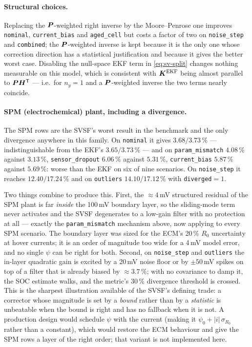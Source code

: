 \paragraph{Structural choices.}  Replacing the $\bm{P}$-weighted right inverse by the Moore--Penrose
one improves \texttt{nominal}, \texttt{current\_bias} and \texttt{aged\_cell} but costs a factor of
two on \texttt{noise\_step} and \texttt{combined}; the $\bm{P}$-weighted inverse is kept because it is
the only one whose correction direction has a statistical justification and because it gives the
better worst case.  Disabling the null-space EKF term in \eqref{eq:sv-split} changes nothing
measurable on this model, which is consistent with $\bm{K}^{\mathrm{EKF}}$ being almost parallel to
$\bm{P}\bm{H}^{\mathsf{T}}$ --- i.e.\ for $n_y=1$ and a $\bm{P}$-weighted inverse the two terms nearly coincide.

\paragraph{SPM (electrochemical) plant, including a divergence.}  The SPM rows are the SVSF's worst
result in the benchmark and the only divergence anywhere in this family.  On \texttt{nominal} it
gives $3.68/3.73\,\%$ --- indistinguishable from the EKF's $3.65/3.73\,\%$ --- and on
\texttt{param\_mismatch} $4.08\,\%$ against $3.13\,\%$, \texttt{sensor\_dropout} $6.06\,\%$ against
$5.31\,\%$, \texttt{current\_bias} $5.87\,\%$ against $5.69\,\%$: worse than the EKF on six of nine
scenarios.  On \texttt{noise\_step} it reaches $12.40/17.24\,\%$ and on \texttt{outliers}
$14.10/17.12\,\%$ with \texttt{diverged}$=1$.

Two things combine to produce this.  First, the $\approx4$\,mV structured residual of the SPM plant
is far \emph{inside} the 100\,mV boundary layer, so the sliding-mode term never activates and the
SVSF degenerates to a low-gain filter with no protection at all --- exactly the
\texttt{param\_mismatch} mechanism above, now applying to every SPM scenario.  The boundary layer
was sized for the ECM's 20\,\% $R_0$ uncertainty at hover currents; it is an order of magnitude too
wide for a 4\,mV model error, and no single $\psi$ can be right for both.  Second, on
\texttt{noise\_step} and \texttt{outliers} the in-layer quadratic gain is excited by a 20\,mV noise
floor or by $\pm50$\,mV spikes on top of a filter that is already biased by $\approx3.7\,\%$; with
no covariance to damp it, the SOC estimate walks, and the metric's $30\,\%$ divergence threshold is
crossed.  This is the sharpest illustration available of the SVSF's defining trade: a corrector
whose magnitude is set by a \emph{bound} rather than by a \emph{statistic} is unbeatable when the
bound is right and has no fallback when it is not.  A production design would schedule $\psi$ with
the current (making it $\psi_0+|i|\,\sigma_{R_0}$ rather than a constant), which would restore the
ECM behaviour and give the SPM rows a layer of the right order; that variant is not implemented
here.


